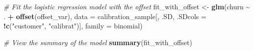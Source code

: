 \documentclass[
]{article}
\newenvironment{Shaded}{\begin{snugshade}}{\end{snugshade}}
\newcommand{\AttributeTok}[1]{\textcolor[rgb]{0.13,0.29,0.53}{#1}}
\newcommand{\CommentTok}[1]{\textcolor[rgb]{0.56,0.35,0.01}{\textit{#1}}}
\newcommand{\FunctionTok}[1]{\textcolor[rgb]{0.13,0.29,0.53}{\textbf{#1}}}
\newcommand{\NormalTok}[1]{#1}
\newcommand{\OtherTok}[1]{\textcolor[rgb]{0.56,0.35,0.01}{#1}}
\newcommand{\SpecialCharTok}[1]{\textcolor[rgb]{0.81,0.36,0.00}{\textbf{#1}}}
\newcommand{\StringTok}[1]{\textcolor[rgb]{0.31,0.60,0.02}{#1}}
\begin{document}
\begin{Shaded}
\begin{Highlighting}[]
\CommentTok{\# Fit the logistic regression model with the offset}
\NormalTok{fit\_with\_offset }\OtherTok{\textless{}{-}} \FunctionTok{glm}\NormalTok{(churn }\SpecialCharTok{\textasciitilde{}}\NormalTok{ . }\SpecialCharTok{+} \FunctionTok{offset}\NormalTok{(offset\_var), }
                       \AttributeTok{data =}\NormalTok{ calibration\_sample[, .SD, }\AttributeTok{.SDcols =} \SpecialCharTok{!}\FunctionTok{c}\NormalTok{(}\StringTok{"customer"}\NormalTok{, }\StringTok{"calibrat"}\NormalTok{)],}
                       \AttributeTok{family =}\NormalTok{ binomial)}

\CommentTok{\# View the summary of the model}
\FunctionTok{summary}\NormalTok{(fit\_with\_offset)}
\end{Highlighting}
\end{Shaded}
\end{document}
